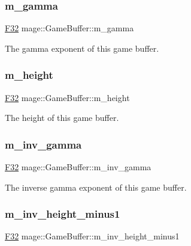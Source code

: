 \subsubsection{\texorpdfstring{m\+\_\+gamma}{m\_gamma}}
{\footnotesize\ttfamily \hyperlink{namespacemage_aa97e833b45f06d60a0a9c4fc22ae02c0}{F32} mage\+::\+Game\+Buffer\+::m\+\_\+gamma}

The gamma exponent of this game buffer. \hypertarget{structmage_1_1_game_buffer_a0daa4c82b772633085b27bf51b5b081c}{}\label{structmage_1_1_game_buffer_a0daa4c82b772633085b27bf51b5b081c} 
\subsubsection{\texorpdfstring{m\+\_\+height}{m\_height}}
{\footnotesize\ttfamily \hyperlink{namespacemage_aa97e833b45f06d60a0a9c4fc22ae02c0}{F32} mage\+::\+Game\+Buffer\+::m\+\_\+height}

The height of this game buffer. \hypertarget{structmage_1_1_game_buffer_a52ddb29e16782a4dcc4e6818b3983c20}{}\label{structmage_1_1_game_buffer_a52ddb29e16782a4dcc4e6818b3983c20} 
\subsubsection{\texorpdfstring{m\+\_\+inv\+\_\+gamma}{m\_inv\_gamma}}
{\footnotesize\ttfamily \hyperlink{namespacemage_aa97e833b45f06d60a0a9c4fc22ae02c0}{F32} mage\+::\+Game\+Buffer\+::m\+\_\+inv\+\_\+gamma}

The inverse gamma exponent of this game buffer. \hypertarget{structmage_1_1_game_buffer_a2f049063194681c3beabc63938754a89}{}\label{structmage_1_1_game_buffer_a2f049063194681c3beabc63938754a89} 
\subsubsection{\texorpdfstring{m\+\_\+inv\+\_\+height\+\_\+minus1}{m\_inv\_height\_minus1}}
{\footnotesize\ttfamily \hyperlink{namespacemage_aa97e833b45f06d60a0a9c4fc22ae02c0}{F32} mage\+::\+Game\+Buffer\+::m\+\_\+inv\+\_\+height\+\_\+minus1}

